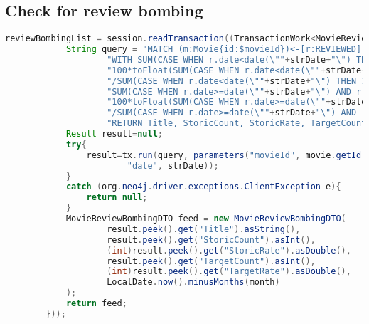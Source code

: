 \subsection{Check for review bombing}
\begin{lstlisting}[language = Java, caption = review bombing]
reviewBombingList = session.readTransaction((TransactionWork<MovieReviewBombingDTO>)(tx -> {
            String query = "MATCH (m:Movie{id:$movieId})<-[r:REVIEWED]-() " +
                    "WITH SUM(CASE WHEN r.date<date(\""+strDate+"\") THEN 1 ELSE 0 END) as StoricCount, " +
                    "100*toFloat(SUM(CASE WHEN r.date<date(\""+strDate+"\") AND r.freshness = true THEN 1 ELSE 0 END))" +
                    "/SUM(CASE WHEN r.date<date(\""+strDate+"\") THEN 1 ELSE 0 END) as StoricRate, " +
                    "SUM(CASE WHEN r.date>=date(\""+strDate+"\") AND r.date<date(\""+todayString+"\") THEN 1 ELSE 0 END) as TargetCount, " +
                    "100*toFloat(SUM(CASE WHEN r.date>=date(\""+strDate+"\") AND r.date<date(\""+todayString+"\") AND r.freshness = true THEN 1 ELSE 0 END))" +
                    "/SUM(CASE WHEN r.date>=date(\""+strDate+"\") AND r.date<date(\""+todayString+"\") THEN 1 ELSE 0 END) as TargetRate, m.title as Title " +
                    "RETURN Title, StoricCount, StoricRate, TargetCount, TargetRate";
            Result result=null;
            try{
                result=tx.run(query, parameters("movieId", movie.getId().toString(),
                        "date", strDate));
            }
            catch (org.neo4j.driver.exceptions.ClientException e){
                return null;
            }
            MovieReviewBombingDTO feed = new MovieReviewBombingDTO(
                    result.peek().get("Title").asString(),
                    result.peek().get("StoricCount").asInt(),
                    (int)result.peek().get("StoricRate").asDouble(),
                    result.peek().get("TargetCount").asInt(),
                    (int)result.peek().get("TargetRate").asDouble(),
                    LocalDate.now().minusMonths(month)
            );
            return feed;
        }));
\end{lstlisting}
%